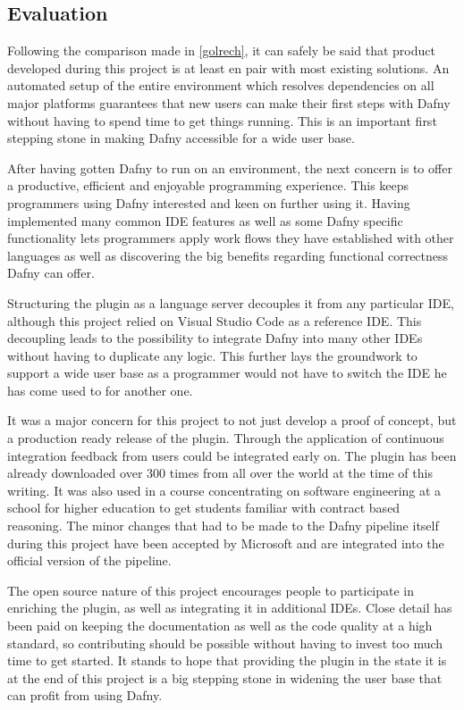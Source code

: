 \subsection{Evaluation}
Following the comparison made in \ref{golrech}, it can safely be said that product developed during this project is at least en pair with most existing solutions. An automated setup of the entire environment which resolves dependencies on all major platforms guarantees that new users can make their first steps with Dafny without having to spend time to get things running. This is an important first stepping stone in making Dafny accessible for a wide user base. \newline

After having gotten Dafny to run on an environment, the next concern is to offer a productive, efficient and enjoyable programming experience. This keeps programmers using Dafny interested and keen on further using it. Having implemented many common IDE features as well as some Dafny specific functionality lets programmers apply work flows they have established with other languages as well as discovering the big benefits regarding functional correctness Dafny can offer. \newline

Structuring the plugin as a language server decouples it from any particular IDE, although this project relied on Visual Studio Code as a reference IDE. This decoupling leads to the possibility to integrate Dafny into many other IDEs without having to duplicate any logic. This further lays the groundwork to support a wide user base as a programmer would not have to switch the IDE he has come used to for another one. \newline

It was a major concern for this project to not just develop a proof of concept, but a production ready release of the plugin. Through the application of continuous integration feedback from users could be integrated early on. The plugin has been already downloaded over 300 times from all over the world at the time of this writing. It was also used in a course concentrating on software engineering at a school for higher education to get students familiar with contract based reasoning. The minor changes that had to be made to the Dafny pipeline itself during this project have been accepted by Microsoft and are integrated into the official version of the pipeline. \newline

The open source nature of this project encourages people to participate in enriching the plugin, as well as integrating it in additional IDEs. Close detail has been paid on keeping the documentation as well as the code quality at a high standard, so contributing should be possible without having to invest too much time to get started. It stands to hope that providing the plugin in the state it is at the end of this project is a big stepping stone in widening the user base that can profit from using Dafny. 